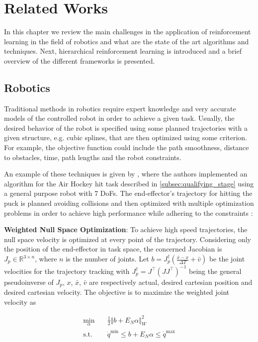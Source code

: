 \chapter{Related Works}
\label{ch:related_works}
In this chapter we review the main challenges in the application of reinforcement learning in the
field of robotics and what are the state of the art algorithms and techniques. 
Next, hierarchical reinforcement learning is introduced and a brief overview of the different frameworks is presented.

\section{Robotics}
Traditional methods in robotics require expert knowledge and very accurate models of the controlled robot in order to achieve a given task.
Usually, the desired behavior of the robot is specified using some planned trajectories with a given structure, e.g. cubic splines, that are then optimized
using some criterion. For example, the objective function could include the path smoothness, distance to obstacles, time, path lengths and the robot constraints.

An example of these techniques is given by \cite{baseline}, where the authors implemented an algorithm for the Air Hockey hit task described in \ref{subsec:qualifying_stage} using a general purpose robot with 7 DoFs.
The end-effector's trajectory for hitting the puck is planned avoiding collisions and then optimized with multiple optimization problems in order to achieve high
performance while adhering to the constraints :

\textbf{Weighted Null Space Optimization}:
To achieve high speed trajectories, the null space velocity is optimized at every point of the trajectory. Considering only the position of the end-effector in task space,
the concerned Jacobian is $J_p \in \mathbb{R}^{3\times n}$, where $n$ is the number of joints. Let $b = J^\dag_p\left(\frac{\bar{x} - x}{\Delta T} + \bar{v}\right)$
be the joint velocities for the trajectory tracking with $J_p^\dag = J^\intercal\left(J J^\intercal\right)^{-1}$ being the general pseudoinverse of $J_p$, $x$, $\bar{x}$, $\bar{v}$ are respectively actual, desired cartesian position and desired cartesian velocity.
The objective is to maximize the weighted joint velocity as

\begin{equation*}
    \begin{aligned}
        \min_\alpha  \quad&\frac{1}{2} \Vert b + E_N \alpha \Vert^{2}_W \\
        \text{s.t.}  \quad&\dot{q}^{\min} \le b + E_N \alpha \le \dot{q}^{\max}
    \end{aligned}
\end{equation*}

